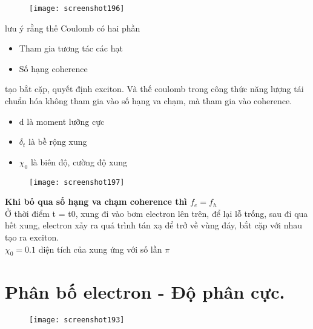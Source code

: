 \documentclass[16Pt]{article}
\begin{document}
	\begin{figure}[h!]
		\centering
		\texttt{[image: screenshot196]}
	\end{figure}
	
	lưu ý rằng thế Coulomb có hai phần
	\begin{itemize}
		\item Tham gia tương tác các hạt 
		\item Số hạng coherence
	\end{itemize}
	tạo bắt cặp, quyết định exciton. Và thế coulomb trong công thức năng lượng tái chuẩn hóa không tham gia vào số hạng va chạm, mà tham gia vào coherence.
	
	\begin{itemize}
		\item d là moment lưỡng cực
		\item $\delta_t$ là bề rộng xung
		\item $\chi_0$ là biên độ, cường độ xung 
	\end{itemize}
	\newpage
	\begin{figure}[h!]
		\centering
		\texttt{[image: screenshot197]}
	\end{figure}
	
	\noindent\textbf{Khi bỏ qua số hạng va chạm coherence thì $f_e = f_h$}\\
	Ở thời điểm t = t0, xung đi vào bơm electron lên trên, để lại lỗ trống, sau đi qua hết xung, electron xảy ra quá trình tán xạ để trở về vùng đáy, bắt cặp với nhau tạo ra exciton. \\
	$\chi_0 = 0.1 $ diện tích của xung ứng với số lần $\pi$ \\
	
	\newpage
	\section{Phân bố electron - Độ phân cực.}
	\begin{figure}[h!]
		\centering
		\texttt{[image: screenshot193]}
	\end{figure}
	
\end{document}
